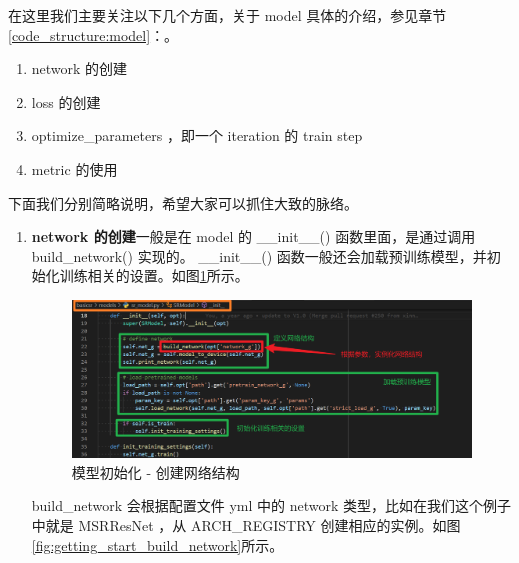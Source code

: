 \documentclass[../main.tex]{subfiles}
\begin{document}
\begin{enumerate}
          在这里我们主要关注以下几个方面，关于 model 具体的介绍，参见章节\ref{code_structure:model}：。

          \begin{enumerate}
              \item network 的创建
              \item loss 的创建
              \item optimize\_parameters ，即一个 iteration 的 train step
              \item metric 的使用
          \end{enumerate}

          下面我们分别简略说明，希望大家可以抓住大致的脉络。

          \begin{enumerate}

              \item \textbf{network 的创建}一般是在 model 的 \_\_init\_\_() 函数里面，是通过调用 build\_network() 实现的。 \_\_init\_\_() 函数一般还会加载预训练模型，并初始化训练相关的设置。如图\ref{fig:getting_start_network_init}所示。

                    \begin{figure}[h]
                        \begin{center}
                            \vspace{-0.2cm}
                            \includegraphics[width=0.85\linewidth]{figures/getting_start_network_init.png}
                            \vspace{-0.3cm}
                            \caption{模型初始化 - 创建网络结构}
                            \label{fig:getting_start_network_init}
                        \end{center}
                        \vspace{-0.5cm}
                    \end{figure}

                    build\_network 会根据配置文件 yml 中的 network 类型，比如在我们这个例子中就是 MSRResNet ，从 ARCH\_REGISTRY 创建相应的实例。如图\ref{fig:getting_start_build_network}所示。


\end{enumerate}
\end{enumerate}
\end{document}
